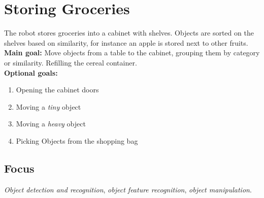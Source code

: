 \section{Storing Groceries}\label{test:storing-groceries}
The robot stores groceries into a cabinet with shelves. Objects are sorted on the shelves based on similarity, for instance an apple is stored next to other fruits.\\

\noindent \textbf{Main goal:} Move objects from a table to the cabinet, grouping them by category or similarity. Refilling the cereal container.\\

\noindent \textbf{Optional goals:}
\begin{enumerate}[nosep]
	\item Opening the cabinet doors
	\item Moving a \emph{tiny} object
	\item Moving a \emph{heavy} object
	\item Picking Objects from the shopping bag
\end{enumerate}

\subsection*{Focus}
\emph{Object detection and recognition}, \emph{object feature recognition}, \emph{object manipulation}.

